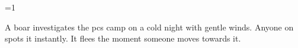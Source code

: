\ifnum\value{cycle}=1

  A boar investigates the \glspl{pc} camp on a cold night with gentle winds.
  Anyone on  spots it instantly.
  It flees the moment someone moves towards it.

  \boar

\fi
